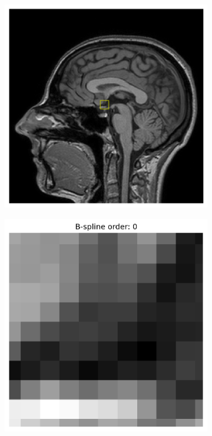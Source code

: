 \documentclass[10pt,twoside]{book}
\begin{document}
\begin{figure}
  \centering
  \begin{subfigure}[b]{0.48\textwidth}
     \includegraphics[width=\textwidth]{interpolation2D_areaIndication}
     \caption{}
     \label{fig:interpolation2D_areaIndication}
  \end{subfigure}
  \hfill
  \begin{subfigure}[b]{0.48\textwidth}
     \includegraphics[width=\textwidth]{interpolation2D_BSplineOrder0}

\end{subfigure}
\end{figure}
\end{document}
